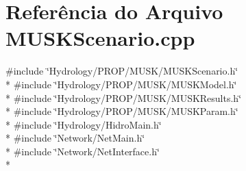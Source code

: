 \section{Referência do Arquivo M\+U\+S\+K\+Scenario.\+cpp}
\label{_m_u_s_k_scenario_8cpp}
{\ttfamily \#include \char`\"{}Hydrology/\+P\+R\+O\+P/\+M\+U\+S\+K/\+M\+U\+S\+K\+Scenario.\+h\char`\"{}}\\*
{\ttfamily \#include \char`\"{}Hydrology/\+P\+R\+O\+P/\+M\+U\+S\+K/\+M\+U\+S\+K\+Model.\+h\char`\"{}}\\*
{\ttfamily \#include \char`\"{}Hydrology/\+P\+R\+O\+P/\+M\+U\+S\+K/\+M\+U\+S\+K\+Results.\+h\char`\"{}}\\*
{\ttfamily \#include \char`\"{}Hydrology/\+P\+R\+O\+P/\+M\+U\+S\+K/\+M\+U\+S\+K\+Param.\+h\char`\"{}}\\*
{\ttfamily \#include \char`\"{}Hydrology/\+Hidro\+Main.\+h\char`\"{}}\\*
{\ttfamily \#include \char`\"{}Network/\+Net\+Main.\+h\char`\"{}}\\*
{\ttfamily \#include \char`\"{}Network/\+Net\+Interface.\+h\char`\"{}}\\*
